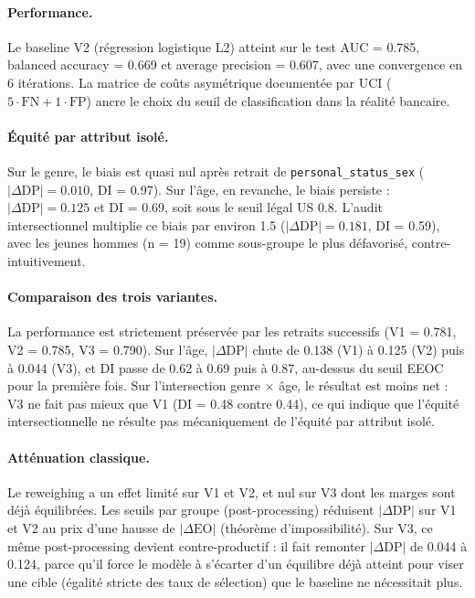 \documentclass[11pt, a4paper]{article}
\begin{document}
\paragraph{Performance.} Le baseline V2 (régression logistique L2) atteint sur le test AUC = 0.785, balanced accuracy = 0.669 et average precision = 0.607, avec une convergence en 6 itérations. La matrice de coûts asymétrique documentée par UCI ($5 \cdot \text{FN} + 1 \cdot \text{FP}$) ancre le choix du seuil de classification dans la réalité bancaire.

\paragraph{Équité par attribut isolé.} Sur le genre, le biais est quasi nul après retrait de \texttt{personal\_status\_sex} ($|\Delta\text{DP}| = 0.010$, DI = 0.97). Sur l'âge, en revanche, le biais persiste : $|\Delta\text{DP}| = 0.125$ et DI = 0.69, soit sous le seuil légal US 0.8. L'audit intersectionnel multiplie ce biais par environ 1.5 ($|\Delta\text{DP}| = 0.181$, DI = 0.59), avec les jeunes hommes (n = 19) comme sous-groupe le plus défavorisé, contre-intuitivement.

\paragraph{Comparaison des trois variantes.} La performance est strictement préservée par les retraits successifs (V1 = 0.781, V2 = 0.785, V3 = 0.790). Sur l'âge, $|\Delta\text{DP}|$ chute de 0.138 (V1) à 0.125 (V2) puis à 0.044 (V3), et DI passe de 0.62 à 0.69 puis à 0.87, au-dessus du seuil EEOC pour la première fois. Sur l'intersection genre $\times$ âge, le résultat est moins net : V3 ne fait pas mieux que V1 (DI = 0.48 contre 0.44), ce qui indique que l'équité intersectionnelle ne résulte pas mécaniquement de l'équité par attribut isolé.

\paragraph{Atténuation classique.} Le reweighing a un effet limité sur V1 et V2, et nul sur V3 dont les marges sont déjà équilibrées. Les seuils par groupe (post-processing) réduisent $|\Delta\text{DP}|$ sur V1 et V2 au prix d'une hausse de $|\Delta\text{EO}|$ (théorème d'impossibilité). Sur V3, ce même post-processing devient contre-productif : il fait remonter $|\Delta\text{DP}|$ de 0.044 à 0.124, parce qu'il force le modèle à s'écarter d'un équilibre déjà atteint pour viser une cible (égalité stricte des taux de sélection) que le baseline ne nécessitait plus.
\end{document}
